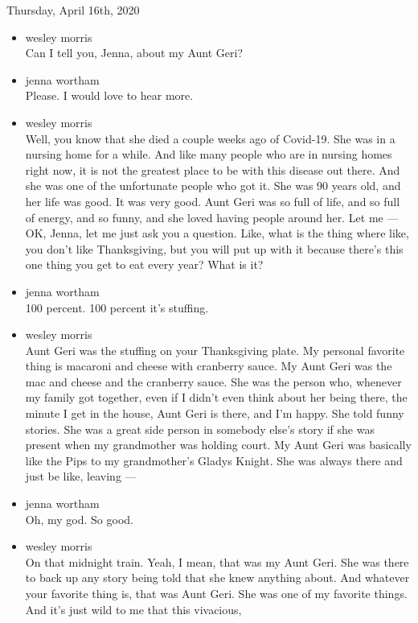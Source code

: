 Thursday, April 16th, 2020

\begin{itemize}
\item
  wesley morris\\
  Can I tell you, Jenna, about my Aunt Geri?
\item
  jenna wortham\\
  Please. I would love to hear more.
\item
  wesley morris\\
  Well, you know that she died a couple weeks ago of Covid-19. She was
  in a nursing home for a while. And like many people who are in nursing
  homes right now, it is not the greatest place to be with this disease
  out there. And she was one of the unfortunate people who got it. She
  was 90 years old, and her life was good. It was very good. Aunt Geri
  was so full of life, and so full of energy, and so funny, and she
  loved having people around her. Let me --- OK, Jenna, let me just ask
  you a question. Like, what is the thing where like, you don't like
  Thanksgiving, but you will put up with it because there's this one
  thing you get to eat every year? What is it?
\item
  jenna wortham\\
  100 percent. 100 percent it's stuffing.
\item
  wesley morris\\
  Aunt Geri was the stuffing on your Thanksgiving plate. My personal
  favorite thing is macaroni and cheese with cranberry sauce. My Aunt
  Geri was the mac and cheese and the cranberry sauce. She was the
  person who, whenever my family got together, even if I didn't even
  think about her being there, the minute I get in the house, Aunt Geri
  is there, and I'm happy. She told funny stories. She was a great side
  person in somebody else's story if she was present when my grandmother
  was holding court. My Aunt Geri was basically like the Pips to my
  grandmother's Gladys Knight. She was always there and just be like,
  leaving ---
\item
  jenna wortham\\
  Oh, my god. So good.
\item
  wesley morris\\
  On that midnight train. Yeah, I mean, that was my Aunt Geri. She was
  there to back up any story being told that she knew anything about.
  And whatever your favorite thing is, that was Aunt Geri. She was one
  of my favorite things. And it's just wild to me that this vivacious,

\end{itemize}
